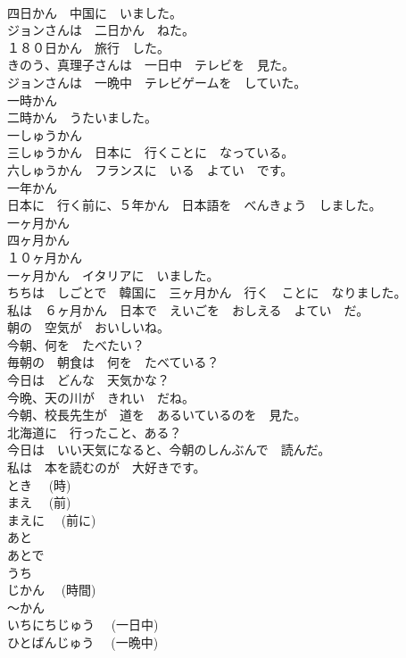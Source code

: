 \documentclass[8pt]{extreport}
\begin{document}
\begin{CJK}{UTF8}{min}
\\	四日かん　中国に　いました。	
\\	ジョンさんは　二日かん　ねた。	
\\	１８０日かん　旅行　した。	
\\	きのう、真理子さんは　一日中　テレビを　見た。	
\\	ジョンさんは　一晩中　テレビゲームを　していた。	
\\	一時かん	
\\	二時かん　うたいました。	
\\	一しゅうかん	
\\	三しゅうかん　日本に　行くことに　なっている。	
\\	六しゅうかん　フランスに　いる　よてい　です。	
\\	一年かん	
\\	日本に　行く前に、５年かん　日本語を　べんきょう　しました。	
\\	一ヶ月かん	
\\	四ヶ月かん	
\\	１０ヶ月かん	
\\	一ヶ月かん　イタリアに　いました。	
\\	ちちは　しごとで　韓国に　三ヶ月かん　行く　ことに　なりました。	
\\	私は　６ヶ月かん　日本で　えいごを　おしえる　よてい　だ。	
\\	朝の　空気が　おいしいね。	
\\	今朝、何を　たべたい？	
\\	毎朝の　朝食は　何を　たべている？	
\\	今日は　どんな　天気かな？	
\\	今晩、天の川が　きれい　だね。	
\\	今朝、校長先生が　道を　あるいているのを　見た。	
\\	北海道に　行ったこと、ある？	
\\	今日は　いい天気になると、今朝のしんぶんで　読んだ。	
\\	私は　本を読むのが　大好きです。	
\\	とき　 (時)	
\\	まえ　 (前)	
\\	まえに　 (前に)	
\\	あと	
\\	あとで	
\\	うち	
\\	じかん　 (時間)	
\\	～かん	
\\	いちにちじゅう　 (一日中)	
\\	ひとばんじゅう　 (一晩中)	

\end{CJK}
\end{document}
